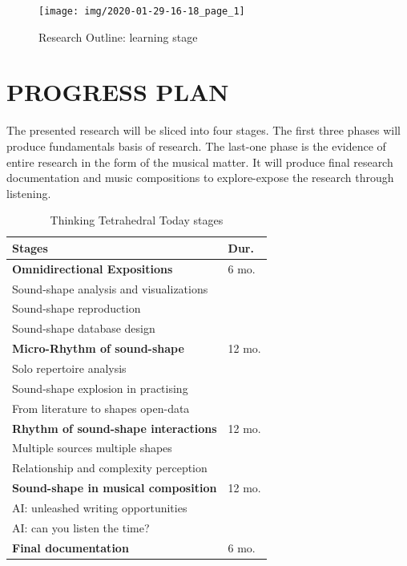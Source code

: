 \documentclass[
	a4paper,
	twocolumn
	]{article}
\begin{document}
\vfill\null

\begin{figure}[htbp]
\centering
\texttt{[image: img/2020-01-29-16-18\_page\_1]}
\caption{Research Outline: learning stage}
\label{outline}
\end{figure}

\section*{PROGRESS PLAN}

The presented research will be sliced into four stages. The first three phases will produce fundamentals basis of research. The last-one phase is the evidence of entire research in the form of the musical matter. It will produce final research documentation and music compositions to explore-expose the research through listening.

\begin{table}[htp]
\begin{center}
\begin{tabular}{ll}
\textbf{Stages} & \textbf{Dur.} \\
\hline
\textbf{Omnidirectional Expositions} & 6 mo. \\
Sound-shape analysis and visualizations & \\
Sound-shape reproduction & \\
Sound-shape database design & \\
\hline
\textbf{Micro-Rhythm of sound-shape} & 12 mo. \\
Solo repertoire analysis & \\
Sound-shape explosion in practising & \\
From literature to shapes open-data & \\
\hline
\textbf{Rhythm of sound-shape interactions} & 12 mo. \\
Multiple sources multiple shapes & \\
Relationship and complexity perception & \\
\hline
\textbf{Sound-shape in musical composition} & 12 mo. \\
AI: unleashed writing opportunities & \\
AI: can you listen the time? & \\
\hline
\textbf{Final documentation} & 6 mo. \\
\end{tabular}
\label{timesheet}
\caption{Thinking Tetrahedral Today stages}
\end{center}
\end{table}%
\end{document}
